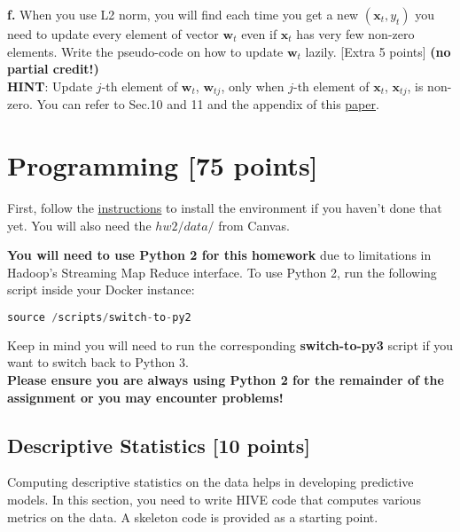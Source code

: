 \documentclass[12pt]{article}
\begin{document}
\textbf{f.} When you use L2 norm, you will find each time you get a new $(\mathbf{x}_t, y_t)$ you need to update every element of vector $\mathbf{w}_t$ even if $\mathbf{x}_t$ has very few non-zero elements. Write the pseudo-code on how to update $\mathbf{w}_t$ lazily. [Extra 5 points] \textbf{(no partial credit!)} \\

\textbf{HINT}: Update $j$-th element of $\mathbf{w}_{t}$, $\mathbf{w}_{tj}$, only when $j$-th element of $\mathbf{x}_{t}$, $\mathbf{x}_{tj}$, is non-zero. You can refer to Sec.10 and 11 and the appendix of this \href{http://lingpipe.files.wordpress.com/2008/04/lazysgdregression.pdf}{paper}. 

\section{Programming [75 points]}
First, follow the \href{http://www.sunlab.org/teaching/cse6250/spring2018/lab/environment/}{instructions} to install the environment if you haven't done that yet. You will also need the $hw2/data/$ from Canvas. 

\textbf{You will need to use Python 2 for this homework} due to limitations in Hadoop's Streaming Map Reduce interface. To use Python 2, run the following script inside your Docker instance: \\

\begin{lstlisting}[frame=single,language=python]
source /scripts/switch-to-py2
\end{lstlisting}

Keep in mind you will need to run the corresponding \textbf{switch-to-py3} script if you want to switch back to Python 3. \\

\textbf{Please ensure you are always using Python 2 for the remainder of the assignment or you may encounter problems!}


\subsection{Descriptive Statistics [10 points]}
Computing descriptive statistics on the data helps in developing predictive models. In this section, you need to write HIVE code that computes various metrics on the data. A skeleton code is provided as a starting point. \\
\end{document}
